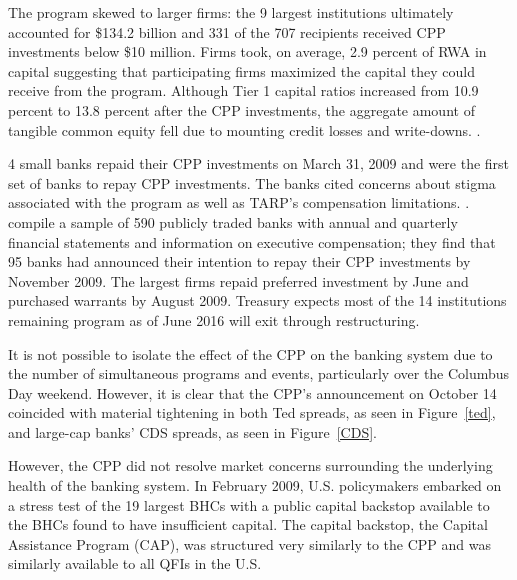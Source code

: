 \documentclass[12pt]{article}
\begin{document}
The program skewed to larger firms: the 9 largest institutions ultimately accounted for \$134.2 billion and 331 of the 707 recipients received CPP investments below \$10 million. Firms took, on average, 2.9 percent of RWA in capital suggesting that participating firms maximized the capital they could receive from the program. Although Tier 1 capital ratios increased from 10.9 percent to 13.8 percent after the CPP investments, the aggregate amount of tangible common equity fell due to mounting credit losses and write-downs. \citep{Ba}.

4 small banks repaid their CPP investments on March 31, 2009 and were the first set of banks to repay CPP investments. The banks cited concerns about stigma associated with the program as well as TARP's compensation limitations. \citep{SmallRepay}. \citet{Ba} compile a sample of 590 publicly traded banks with annual and quarterly financial statements and information on executive compensation; they find that 95 banks had announced their intention to repay their CPP investments by November 2009. The largest firms repaid preferred investment by June and purchased warrants by August 2009. Treasury expects most of the 14 institutions remaining program as of June 2016 will exit through restructuring.

It is not possible to isolate the effect of the CPP on the banking system due to the number of simultaneous programs and events, particularly over the Columbus Day weekend. However, it is clear that the CPP's announcement on October 14 coincided with material tightening in both Ted spreads, as seen in Figure~\ref{ted}, and large-cap banks' CDS spreads, as seen in Figure~\ref{CDS}.

However, the CPP did not resolve market concerns surrounding the underlying health of the banking system. In February 2009, U.S. policymakers embarked on a stress test of the 19 largest BHCs with a public capital backstop available to the BHCs found to have insufficient capital. The capital backstop, the Capital Assistance Program (CAP), was structured very similarly to the CPP and was similarly available to all QFIs in the U.S.
\end{document}
